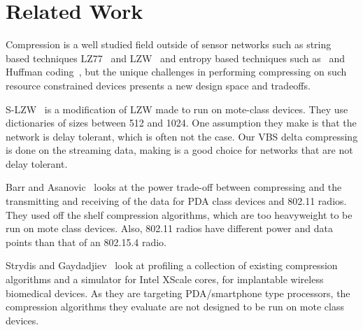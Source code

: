\section{Related Work}
\label{sec-related}
Compression is a well studied field outside of sensor networks such as
string based techniques LZ77~\cite{lz77} and LZW~\cite{lzw} and
entropy based techniques such as~\cite{cleary} and Huffman
coding~\cite{huffman}, but the unique challenges in performing
compressing on such resource constrained devices presents a new design
space and tradeoffs.

S-LZW~\cite{s-lzw} is a modification of LZW made to run on mote-class
devices.  They use dictionaries of sizes between 512 and 1024.  One
assumption they make is that the network is delay tolerant, which is
often not the case.  Our VBS delta compressing is done on the
streaming data, making is a good choice for networks that are not
delay tolerant.  

Barr and Asanovic~\cite{barr} looks at the power trade-off between
compressing and the transmitting and receiving of the data for PDA
class devices and 802.11 radios.  They used off the shelf compression
algorithms, which are too heavyweight to be run on mote class
devices.  Also, 802.11 radios have different power and data points
than that of an 802.15.4 radio.  

Strydis and Gaydadjiev~\cite{strydis} look at profiling a collection of
existing compression algorithms and a simulator for Intel XScale
cores, for implantable wireless biomedical devices.  As they are
targeting PDA/smartphone type processors, the compression algorithms
they evaluate are not designed to be run on mote class devices. 
